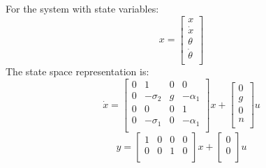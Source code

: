For the system with state variables:\begin{equation}
x = 
\begin{bmatrix}
x\\
\dot x\\
\theta\\
\dot \theta\\
\end{bmatrix}\end{equation}The state space representation is: \begin{equation}
\dot x = \begin{bmatrix}
0&1&0&0\\
0&-\sigma_2&g&-\alpha_1\\
0&0&0&1\\
0&-\sigma_1&0&-\alpha_1\\
\end{bmatrix}
x + \begin{bmatrix}
0\\
g\\
0\\
n\\
\end{bmatrix}
u
\end{equation}
\begin{equation}
y = \begin{bmatrix}
1&0&0&0\\
0&0&1&0\\
\end{bmatrix}
x + \begin{bmatrix}
0\\
0\\
\end{bmatrix}
u
\end{equation}
